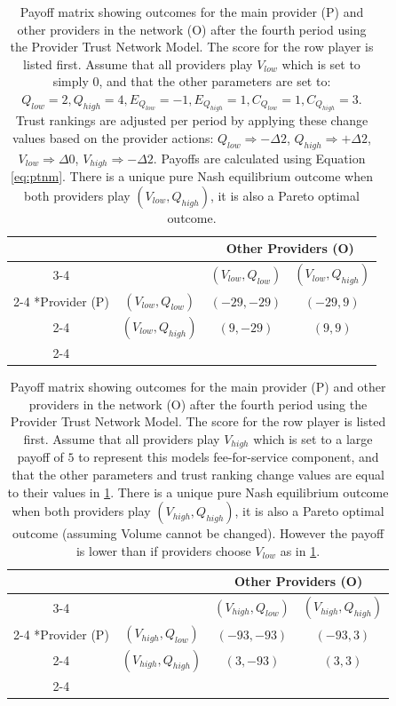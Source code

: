 \documentclass{article}
\begin{document}
\begin{table}[H]
\centering
  \setlength{\extrarowheight}{2pt}
  \begin{tabular}{*{4}{c|}}
    \multicolumn{2}{c}{} & \multicolumn{2}{c}{Other Providers (O)}\\\cline{3-4}
    \multicolumn{1}{c}{} &  & $(V_{low}, Q_{low})$  & $(V_{low}, Q_{high})$ \\\cline{2-4}
    \multirow{2}*{Provider (P)}  & $(V_{low}, Q_{low})$ & $(-29, -29)$ & $(-29, 9)$ \\\cline{2-4}
    & $(V_{low}, Q_{high})$ & $(9, -29)$ & $(9, 9)$ \\\cline{2-4}
  \end{tabular}
\caption{Payoff matrix showing outcomes for the main provider (P) and other providers in the network (O) after the fourth period using the Provider Trust Network Model. The score for the row player is listed first. Assume that all providers play $V_{low}$ which is set to simply $0$, and that the other parameters are set to: $Q_{low} = 2, Q_{high} = 4, E_{Q_{low}} = -1, E_{Q_{high}} = 1, C_{Q_{low}} = 1, C_{Q_{high}} = 3$. Trust rankings are adjusted per period by applying these change values based on the provider actions: $Q_{low} \Rightarrow -\Delta 2$, $Q_{high} \Rightarrow +\Delta 2$, $V_{low} \Rightarrow \Delta 0$, $V_{high} \Rightarrow -\Delta 2$. Payoffs are calculated using Equation \ref{eq:ptnm}. There is a unique pure Nash equilibrium outcome when both providers play $(V_{low}, Q_{high})$, it is also a Pareto optimal outcome.}
\label{table:ptnlow}
\end{table}

\begin{table}[H]
\centering
  \setlength{\extrarowheight}{2pt}
  \begin{tabular}{*{4}{c|}}
    \multicolumn{2}{c}{} & \multicolumn{2}{c}{Other Providers (O)}\\\cline{3-4}
    \multicolumn{1}{c}{} &  & $(V_{high}, Q_{low})$  & $(V_{high}, Q_{high})$ \\\cline{2-4}
    \multirow{2}*{Provider (P)}  & $(V_{high}, Q_{low})$ & $(-93, -93)$ & $(-93, 3)$ \\\cline{2-4}
    & $(V_{high}, Q_{high})$ & $(3, -93)$ & $(3, 3)$ \\\cline{2-4}
  \end{tabular}
    \caption{Payoff matrix showing outcomes for the main provider (P) and other providers in the network (O) after the fourth period using the Provider Trust Network Model. The score for the row player is listed first. Assume that all providers play $V_{high}$ which is set to a large payoff of $5$ to represent this models fee-for-service component, and that the other parameters and trust ranking change values are equal to their values in \ref{table:ptnlow}. There is a unique pure Nash equilibrium outcome when both providers play $(V_{high}, Q_{high})$, it is also a Pareto optimal outcome (assuming Volume cannot be changed). However the payoff is lower than if providers choose $V_{low}$ as in \ref{table:ptnlow}.}
\label{table:ptnhigh}
\end{table}
\end{document}
